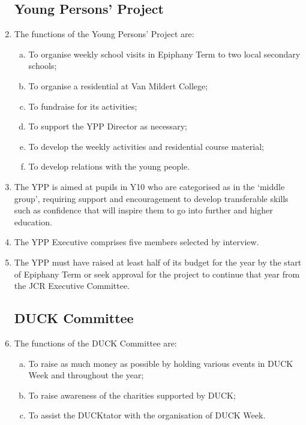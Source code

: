 \documentclass[12pt]{article}
\begin{document}
\begin{enumerate}
    \subsection{Young Persons’ Project}
    \item The functions of the Young Persons’ Project are:
    \begin{enumerate}[(a)]
        \item To organise weekly school visits in Epiphany Term to two local secondary schools;
        \item To organise a residential at Van Mildert College;
        \item To fundraise for its activities;
        \item To support the YPP Director as necessary;
        \item To develop the weekly activities and residential course material;
        \item To develop relations with the young people.
    \end{enumerate}
    \item The YPP is aimed at pupils in Y10 who are categorised as in the ‘middle group’, requiring support and encouragement to develop transferable skills such as confidence that will inspire them to go into further and higher education.
    \item The YPP Executive comprises five members selected by interview.
    \item The YPP must have raised at least half of its budget for the year by the start of Epiphany Term or seek approval for the project to continue that year from the JCR Executive Committee.
    \subsection{DUCK Committee}
    \item The functions of the DUCK Committee are:
    \begin{enumerate}[(a)]
        \item To raise as much money as possible by holding various events in DUCK Week and throughout the year;
        \item To raise awareness of the charities supported by DUCK;
        \item To assist the DUCKtator with the organisation of DUCK Week.
    \end{enumerate}

\end{enumerate}
\end{document}
